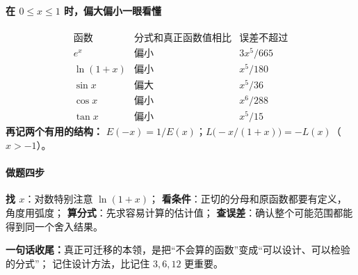 \begin{summarybox}
\paragraph{在 $0\le x\le1$ 时，偏大偏小一眼看懂}
\[
\begin{array}{c|c|c}
\text{函数}&\text{分式和真正函数值相比}&\text{误差不超过}\\\hline
 e^x&\text{偏小}&3x^5/665\\
 \ln(1+x)&\text{偏小}&x^5/180\\
 \sin x&\text{偏大}&x^5/36\\
 \cos x&\text{偏小}&x^6/288\\
 \tan x&\text{偏小}&x^5/15
\end{array}
\]
\textbf{再记两个有用的结构：}
$E(-x)=1/E(x)$；$L\bigl(-x/(1+x)\bigr)=-L(x)$（$x>-1$）。

\paragraph{做题四步}
\textbf{找 $x$}：对数特别注意 $\ln(1+x)$；
\textbf{看条件}：正切的分母和原函数都要有定义，角度用弧度；
\textbf{算分式}：先求容易计算的估计值；
\textbf{查误差}：确认整个可能范围都能得到同一个舍入结果。

\textbf{一句话收尾：}真正可迁移的本领，是把“不会算的函数”变成“可以设计、可以检验的分式”；
记住设计方法，比记住 $3,6,12$ 更重要。
\end{summarybox}
